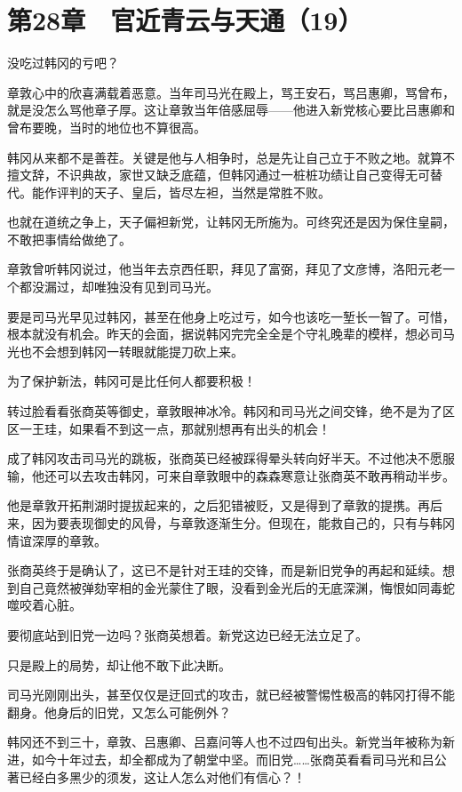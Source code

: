 \section{第28章　官近青云与天通（19）}

没吃过韩冈的亏吧？

章敦心中的欣喜满载着恶意。当年司马光在殿上，骂王安石，骂吕惠卿，骂曾布，就是没怎么骂他章子厚。这让章敦当年倍感屈辱——他进入新党核心要比吕惠卿和曾布要晚，当时的地位也不算很高。

韩冈从来都不是善茬。关键是他与人相争时，总是先让自己立于不败之地。就算不擅文辞，不识典故，家世又缺乏底蕴，但韩冈通过一桩桩功绩让自己变得无可替代。能作评判的天子、皇后，皆尽左袒，当然是常胜不败。

也就在道统之争上，天子偏袒新党，让韩冈无所施为。可终究还是因为保住皇嗣，不敢把事情给做绝了。

章敦曾听韩冈说过，他当年去京西任职，拜见了富弼，拜见了文彦博，洛阳元老一个都没漏过，却唯独没有见到司马光。

要是司马光早见过韩冈，甚至在他身上吃过亏，如今也该吃一堑长一智了。可惜，根本就没有机会。昨天的会面，据说韩冈完完全全是个守礼晚辈的模样，想必司马光也不会想到韩冈一转眼就能提刀砍上来。

为了保护新法，韩冈可是比任何人都要积极！

转过脸看看张商英等御史，章敦眼神冰冷。韩冈和司马光之间交锋，绝不是为了区区一王珪，如果看不到这一点，那就别想再有出头的机会！

成了韩冈攻击司马光的跳板，张商英已经被踩得晕头转向好半天。不过他决不愿服输，他还可以去攻击韩冈，可来自章敦眼中的森森寒意让张商英不敢再稍动半步。

他是章敦开拓荆湖时提拔起来的，之后犯错被贬，又是得到了章敦的提携。再后来，因为要表现御史的风骨，与章敦逐渐生分。但现在，能救自己的，只有与韩冈情谊深厚的章敦。

张商英终于是确认了，这已不是针对王珪的交锋，而是新旧党争的再起和延续。想到自己竟然被弹劾宰相的金光蒙住了眼，没看到金光后的无底深渊，悔恨如同毒蛇噬咬着心脏。

要彻底站到旧党一边吗？张商英想着。新党这边已经无法立足了。

只是殿上的局势，却让他不敢下此决断。

司马光刚刚出头，甚至仅仅是迂回式的攻击，就已经被警惕性极高的韩冈打得不能翻身。他身后的旧党，又怎么可能例外？

韩冈还不到三十，章敦、吕惠卿、吕嘉问等人也不过四旬出头。新党当年被称为新进，如今十年过去，却全都成为了朝堂中坚。而旧党……张商英看看司马光和吕公著已经白多黑少的须发，这让人怎么对他们有信心？！

